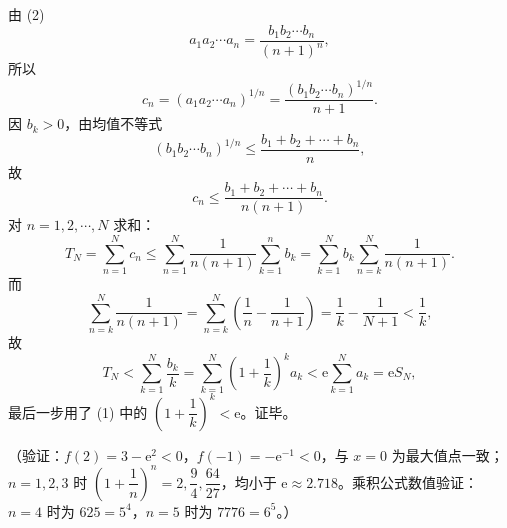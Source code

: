 \begin{answer}

由 (2)
\nopagebreak[4]
\[
a_1a_2\cdots a_n=\dfrac{b_1b_2\cdots b_n}{(n+1)^n},
\]
所以
\nopagebreak[4]
\[
c_n=(a_1a_2\cdots a_n)^{1/n}
=\dfrac{(b_1b_2\cdots b_n)^{1/n}}{n+1}.
\]
因 \(b_k>0\)，由均值不等式
\nopagebreak[4]
\[
(b_1b_2\cdots b_n)^{1/n}\leqslant\dfrac{b_1+b_2+\cdots+b_n}{n},
\]
故
\nopagebreak[4]
\[
c_n\leqslant\dfrac{b_1+b_2+\cdots+b_n}{n(n+1)}.
\]
对 \(n=1,2,\cdots,N\) 求和：
\nopagebreak[4]
\[
T_N=\sum_{n=1}^{N}c_n
\leqslant\sum_{n=1}^{N}\dfrac{1}{n(n+1)}\sum_{k=1}^{n}b_k
=\sum_{k=1}^{N}b_k\sum_{n=k}^{N}\dfrac{1}{n(n+1)}.
\]
而
\nopagebreak[4]
\[
\sum_{n=k}^{N}\dfrac{1}{n(n+1)}
=\sum_{n=k}^{N}\left(\dfrac1n-\dfrac1{n+1}\right)
=\dfrac1k-\dfrac1{N+1}<\dfrac1k,
\]
故
\nopagebreak[4]
\[
T_N<\sum_{k=1}^{N}\dfrac{b_k}{k}
=\sum_{k=1}^{N}\left(1+\dfrac1k\right)^k a_k
<\mathrm{e}\sum_{k=1}^{N}a_k=\mathrm{e}S_N,
\]
最后一步用了 (1) 中的 \(\left(1+\dfrac1k\right)^k<\mathrm{e}\)。证毕。

（验证：\(f(2)=3-\mathrm{e}^2<0\)，\(f(-1)=-\mathrm{e}^{-1}<0\)，与 \(x=0\) 为最大值点一致；\(n=1,2,3\) 时 \(\left(1+\dfrac1n\right)^n=2,\dfrac94,\dfrac{64}{27}\)，均小于 \(\mathrm{e}\approx2.718\)。乘积公式数值验证：\(n=4\) 时为 \(625=5^4\)，\(n=5\) 时为 \(7776=6^5\)。）




\end{answer}